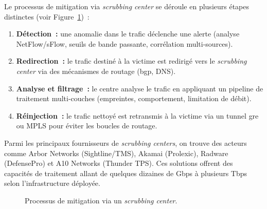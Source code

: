 Le processus de mitigation via \textit{scrubbing center} se déroule en plusieurs étapes distinctes (voir Figure~\ref{fig:scrubbing})~:
\begin{enumerate}
    \item \textbf{Détection~:} une anomalie dans le trafic déclenche une alerte (analyse NetFlow/sFlow, seuils de bande passante, corrélation multi-sources).
    \item \textbf{Redirection~:} le trafic destiné à la victime est redirigé vers le \textit{scrubbing center} via des mécanismes de routage (\gls{bgp}, DNS).
    \item \textbf{Analyse et filtrage~:} le centre analyse le trafic en appliquant un pipeline de traitement multi-couches (empreintes, comportement, limitation de débit).
    \item \textbf{Réinjection~:} le trafic nettoyé est retransmis à la victime via un tunnel \gls{gre} ou MPLS pour éviter les boucles de routage.
\end{enumerate}
Parmi les principaux fournisseurs de \textit{scrubbing centers}, on trouve des acteurs comme Arbor Networks (Sightline/TMS), Akamai (Prolexic), Radware (DefensePro) et A10 Networks (Thunder TPS). Ces solutions offrent des capacités de traitement allant de quelques dizaines de Gbps à plusieurs Tbps selon l'infrastructure déployée.

\begin{figure}[H]
\centering
{}
\caption{Processus de mitigation via un \textit{scrubbing center}.}
\label{fig:scrubbing}
\end{figure}

